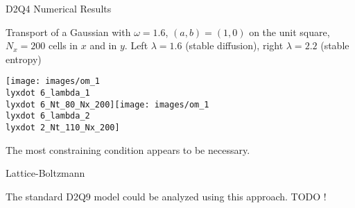 \documentclass[english]{beamer}
\newcommand{\lyxdot}{.}
\begin{document}
%
\begin{frame}{D2Q4 Numerical Results}

Transport of a Gaussian with $\omega=1.6$, $(a,b)=(1,0)$ on
the unit square, $N_{x}=200$ cells in $x$ and in $y$. Left $\lambda=1.6$
(stable diffusion), right $\lambda=2.2$ (stable entropy)
\begin{center}
\texttt{[image: images/om\_1\\lyxdot 6\_lambda\_1\\lyxdot 6\_Nt\_80\_Nx\_200]}\texttt{[image: images/om\_1\\lyxdot 6\_lambda\_2\\lyxdot 2\_Nt\_110\_Nx\_200]}
\par\end{center}

The most constraining condition appears to be necessary.
\end{frame}
%
\begin{frame}{Lattice-Boltzmann \cite{frapolli2015entropic}}

The standard D2Q9 model could be analyzed using this approach. TODO !
\end{frame}
%
\end{document}
